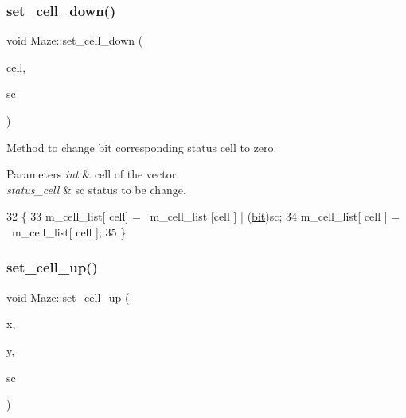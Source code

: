 \mbox{\label{classMaze_a3635b71fab2c610376ae6613e7265fdf}} 
\subsubsection{\texorpdfstring{set\+\_\+cell\+\_\+down()}{set\_cell\_down()}\hspace{0.1cm}{\footnotesize\ttfamily [2/2]}}
{\footnotesize\ttfamily void Maze\+::set\+\_\+cell\+\_\+down (\begin{DoxyParamCaption}\item[{int}]{cell,  }\item[{\hyperlink{classMaze_a07167e321eac2b67100fb82ecb98f1d1}{status\+\_\+cell}}]{sc }\end{DoxyParamCaption})}



Method to change bit corresponding status cell to zero. 


\begin{DoxyParams}{Parameters}
{\em int} & cell of the vector. \\
\hline
{\em status\+\_\+cell} & sc status to be change. \\
\hline
\end{DoxyParams}

\begin{DoxyCode}
32 \{
33     m\_cell\_list[ cell] = ~m\_cell\_list [cell ] | (\hyperlink{maze_8h_a789d352559efaa396a258805d44f4289}{bit})sc;
34     m\_cell\_list[ cell ] = ~m\_cell\_list[ cell ];
35 \}
\end{DoxyCode}
\mbox{\label{classMaze_aa7c832a91a3db8f48b31f688332f8986}} 
\subsubsection{\texorpdfstring{set\+\_\+cell\+\_\+up()}{set\_cell\_up()}\hspace{0.1cm}{\footnotesize\ttfamily [1/2]}}
{\footnotesize\ttfamily void Maze\+::set\+\_\+cell\+\_\+up (\begin{DoxyParamCaption}\item[{int}]{x,  }\item[{int}]{y,  }\item[{\hyperlink{classMaze_a07167e321eac2b67100fb82ecb98f1d1}{status\+\_\+cell}}]{sc }\end{DoxyParamCaption})}



